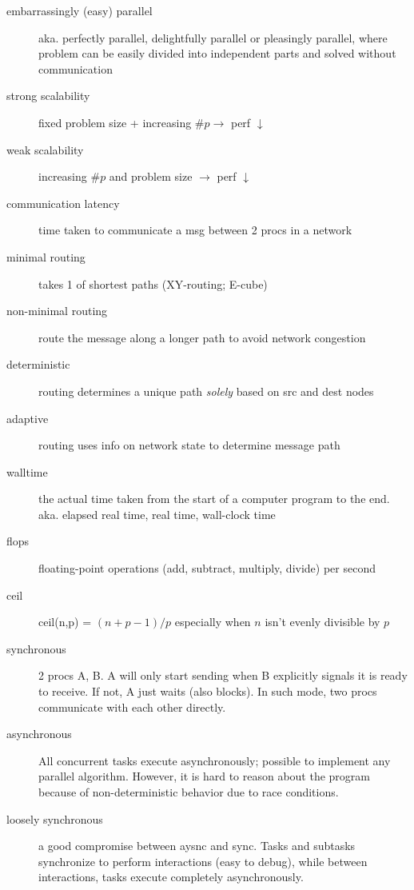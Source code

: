 \begin{description}
\item[embarrassingly (easy) parallel] aka. perfectly parallel, delightfully parallel or pleasingly parallel, where problem can be easily divided into independent parts and solved without communication

\item[strong scalability] fixed problem size + increasing $\# p \rightarrow$ perf $\downarrow$

\item[weak scalability] increasing $\# p$ and problem size $\rightarrow$ perf $\downarrow$

\item[communication latency] time taken to communicate a msg between 2 procs in a network

\item[minimal routing] takes 1 of shortest paths (XY-routing; E-cube)

\item[non-minimal routing] route the message along a longer path to avoid network congestion

\item[deterministic] routing determines a unique path \emph{solely} based on src and dest nodes

\item[adaptive] routing uses info on network state to determine message path

\item[walltime] the actual time taken from the start of a computer program to the end. aka. elapsed real time, real time, wall-clock time
\item[flops] floating-point operations (add, subtract, multiply, divide) per second
\item[ceil] ceil(n,p) = $(n + p - 1) / p$ especially when $n$ isn't evenly divisible by $p$

\item[synchronous] 2 procs A, B. A will only start sending when B explicitly signals it is ready to receive.  If not, A just waits (also blocks).  In such mode, two procs communicate with each other directly.

\item[asynchronous] All concurrent tasks execute asynchronously; possible to implement any parallel algorithm.  However, it is hard to reason about the program because of non-deterministic behavior due to race conditions.

\item[loosely synchronous] a good compromise between aysnc and sync.  Tasks and subtasks synchronize to perform interactions (easy to debug), while between interactions, tasks execute completely asynchronously.


\end{description}
